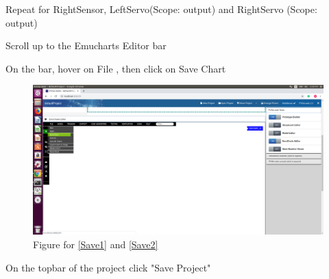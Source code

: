 \documentclass[11pt,a4paper]{../tutorial}
\begin{document}
\begin{instructions}
\item Repeat for RightSensor, LeftServo(Scope: output) and RightServo (Scope: output)
\item Scroll up to the Emucharts Editor bar
\item \label{Save1}On the bar, hover on File , then click on Save Chart
\begin{figure}[h]
\includegraphics[width=1\textwidth]{figures/Save_Chart.png}
\caption{Figure for  \ref{Save1} and \ref{Save2}}
\end{figure}
\item On the topbar of the project click "Save Project"

\end{instructions}
\end{document}
